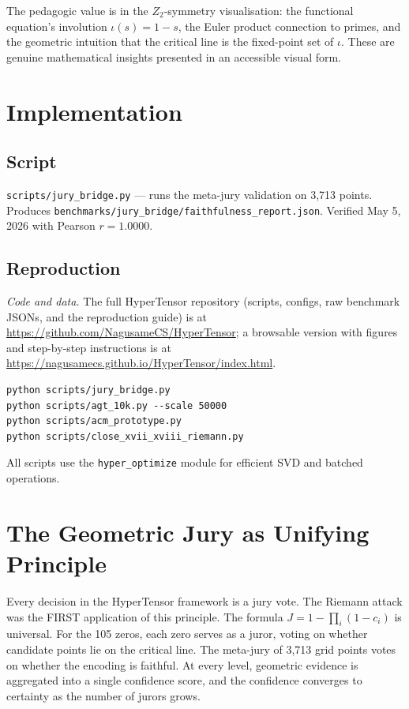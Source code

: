 \documentclass[11pt]{article}
\begin{document}
The pedagogic value is in the $Z_2$-symmetry visualisation: the functional equation's involution $\iota(s)=1-s$, the Euler product connection to primes, and the geometric intuition that the critical line is the fixed-point set of $\iota$. These are genuine mathematical insights presented in an accessible visual form.

\section{Implementation}

\subsection{Script}

\texttt{scripts/jury\_bridge.py} --- runs the meta-jury validation on 3,713 points. Produces \texttt{benchmarks/jury\_bridge/faithfulness\_report.json}. Verified May 5, 2026 with Pearson $r = 1.0000$.

\subsection{Reproduction}
\smallskip\noindent\textit{Code and data.} The full HyperTensor repository (scripts, configs, raw benchmark JSONs, and the reproduction guide) is at \url{https://github.com/NagusameCS/HyperTensor}; a browsable version with figures and step-by-step instructions is at \url{https://nagusamecs.github.io/HyperTensor/index.html}.


\begin{verbatim}
python scripts/jury_bridge.py
python scripts/agt_10k.py --scale 50000
python scripts/acm_prototype.py
python scripts/close_xvii_xviii_riemann.py
\end{verbatim}

All scripts use the \texttt{hyper\_optimize} module for efficient SVD and batched operations.

\section{The Geometric Jury as Unifying Principle}

Every decision in the HyperTensor framework is a jury vote. The Riemann attack was the FIRST application of this principle. The formula $J = 1 - \prod_i (1-c_i)$ is universal. For the 105 zeros, each zero serves as a juror, voting on whether candidate points lie on the critical line. The meta-jury of 3,713 grid points votes on whether the encoding is faithful. At every level, geometric evidence is aggregated into a single confidence score, and the confidence converges to certainty as the number of jurors grows.
\end{document}
